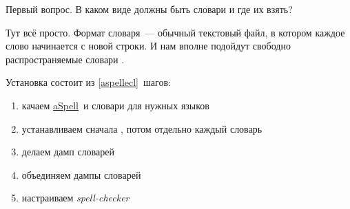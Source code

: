 Первый вопрос. В каком виде должны быть словари и где их взять?

Тут всё просто. Формат словаря\ --- обычный текстовый файл, в котором каждое
слово начинается с новой строки. И нам вполне подойдут свободно распространяемые
словари .

Установка состоит из \ref{aspellecl}\ шагов:
\begin{enumerate}
  \item качаем \href{}{aSpell}\ и словари для нужных языков
  \item устанавливаем сначала , потом отдельно каждый словарь
  \item делаем дамп словарей 
  \item объединяем дампы словарей
  \item \label{aspellecl} настраиваем \emph{spell-checker} \eclipse
\end{enumerate}

